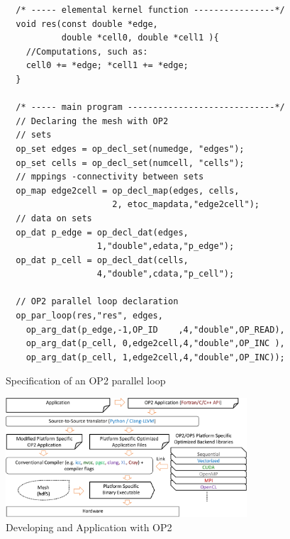\documentclass[runningheads]{llncs}
\begin{document}


\begin{figure}[t]
\begin{verbatim} 
  /* ----- elemental kernel function ----------------*/
  void res(const double *edge,
           double *cell0, double *cell1 ){ 
    //Computations, such as:
    cell0 += *edge; *cell1 += *edge;
  }
  
  /* ----- main program -----------------------------*/
  // Declaring the mesh with OP2
  // sets
  op_set edges = op_decl_set(numedge, "edges");
  op_set cells = op_decl_set(numcell, "cells");
  // mppings -connectivity between sets
  op_map edge2cell = op_decl_map(edges, cells, 
                     2, etoc_mapdata,"edge2cell");
  // data on sets 
  op_dat p_edge = op_decl_dat(edges,
                  1,"double",edata,"p_edge");
  op_dat p_cell = op_decl_dat(cells,
                  4,"double",cdata,"p_cell");
                  
  // OP2 parallel loop declaration
  op_par_loop(res,"res", edges,
    op_arg_dat(p_edge,-1,OP_ID    ,4,"double",OP_READ),
    op_arg_dat(p_cell, 0,edge2cell,4,"double",OP_INC ),
    op_arg_dat(p_cell, 1,edge2cell,4,"double",OP_INC)); 
\end{verbatim}
\vspace{-20pt}\caption{Specification of an OP2 parallel loop}
\label{fig/op2api}\vspace{-10pt}
\end{figure}

\begin{figure}[t]\centering
\includegraphics[width=9cm]{figures/flow}\vspace{-5pt}
\caption{Developing and Application with OP2}
\label{fig/op2flow}\vspace{-15pt}
\end{figure}
\end{document}
